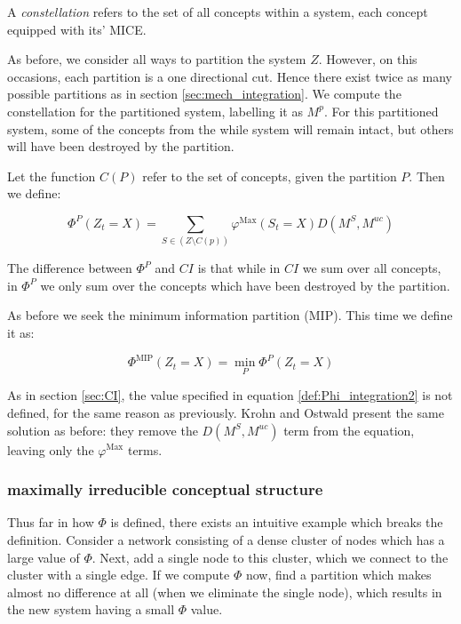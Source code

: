 \begin{definition}
	{A \textit{constellation} refers to the set of all concepts within a system, each concept equipped with its' MICE.}
\end{definition}

As before, we consider all ways to partition the system $Z$. However, on this occasions, each partition is a one directional cut. Hence there exist twice as many possible partitions as in section \ref{sec:mech_integration}. We compute the constellation for the partitioned system, labelling it as $M^p$. For this partitioned system, some of the concepts from the while system will remain intact, but others will have been destroyed by the partition.

Let the function $C(P)$ refer to the set of concepts, given the partition $P$. Then we define:

\begin{equation}
\label{def:Phi_integration1}
\Phi^P(Z_t = X) = \sum \limits_{S \in (Z \setminus C(p))} \varphi^{\text{Max}}(S_t = X)D(M^S, M^{uc})
\end{equation}

The difference between $\Phi^P$ and $CI$ is that while in $CI$ we sum over all concepts, in $\Phi^P$ we only sum over the concepts which have been destroyed by the partition.

As before we seek the minimum information partition (MIP). This time we define it as:

\begin{equation}
\label{def:Phi_integration2}
\Phi^{\text{MIP}} (Z_t = X) = \min \limits_{P} \Phi^P(Z_t = X)
\end{equation}

\begin{remark}
	As in section \ref{sec:CI}, the value specified in equation \ref{def:Phi_integration2} is not defined, for the same reason as previously. Krohn and Ostwald present the same solution as before: they remove the $D(M^S, M^{uc})$ term from the equation, leaving only the $\varphi^{\text{Max}}$ terms.
\end{remark}

\subsubsection{maximally irreducible conceptual structure}

Thus far in how $\Phi$ is defined, there exists an intuitive example which breaks the definition. Consider a network consisting of a dense cluster of nodes which has a large value of $\Phi$. Next, add a single node to this cluster, which we connect to the cluster with a single edge. If we compute $\Phi$ now, find a partition which makes almost no difference at all (when we eliminate the single node), which results in the new system having a small $\Phi$ value. 

